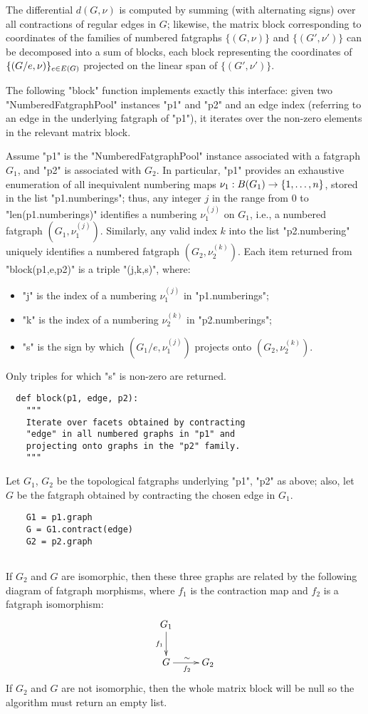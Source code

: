 The differential $d(G,\nu)$ is computed by summing (with alternating
signs) over all contractions of regular edges in $G$; likewise, the
matrix block corresponding to coordinates of the families of numbered
fatgraphs $\{(G,\nu)\}$ and $\{(G',\nu')\}$ can be decomposed into a
sum of blocks, each block representing the coordinates of $\{(G/e,\nu)
\}_{e \in E(G)}$ projected on the linear span of $\{(G',\nu')\}$.

The following "block" function implements exactly this interface:
given two "NumberedFatgraphPool" instances "p1" and "p2" and an edge
index (referring to an edge in the underlying fatgraph of "p1"), it
iterates over the non-zero elements in the relevant matrix block.

Assume "p1" is the "NumberedFatgraphPool" instance associated with a
fatgraph $G_1$, and "p2" is associated with $G_2$.  In particular,
"p1" provides an exhaustive enumeration of all inequivalent numbering
maps $\nu_1: B(G_1) \to \{1, \ldots, n\}$, stored in the list
"p1.numberings"; thus, any integer $j$ in the range from 0 to
"len(p1.numberings)" identifies a numbering $\nu_1^{(j)}$ on $G_1$,
i.e., a numbered fatgraph $(G_1, \nu_1^{(j)})$.  Similarly, any valid
index $k$ into the list "p2.numbering" uniquely identifies a numbered
fatgraph $(G_2, \nu_2^{(k)})$.  Each item returned from
"block(p1,e,p2)" is a triple "(j,k,s)", where:
\begin{itemize}
\item "j" is the index of a numbering $\nu_1^{(j)}$ in "p1.numberings";
\item "k" is the index of a numbering $\nu_2^{(k)}$ in "p2.numberings";
\item "s" is the sign by which $(G_1/e, \nu_1^{(j)})$ projects onto
  $(G_2, \nu_2^{(k)})$.
\end{itemize}
Only triples for which "s" is non-zero are returned.

\begin{lstlisting}
  def block(p1, edge, p2):
    """
    Iterate over facets obtained by contracting 
    "edge" in all numbered graphs in "p1" and 
    projecting onto graphs in the "p2" family.
    """

\end{lstlisting}

Let $G_1$, $G_2$ be the topological fatgraphs underlying "p1", "p2" as
above; also, let $G$ be the fatgraph obtained by contracting the
chosen edge in $G_1$.
\begin{lstlisting}
    G1 = p1.graph
    G = G1.contract(edge)
    G2 = p2.graph
    
\end{lstlisting}
If $G_2$ and $G$ are isomorphic, then these three graphs are related
by the following diagram of fatgraph morphisms, where $f_1$ is the
contraction map and $f_2$ is a fatgraph isomorphism:
\begin{equation*}
  \xymatrix{
    G_1 & 
    \\
    G   &  G_2
    \ar_{f_1} "1,1";"2,1"
    \ar_{f_2}^{\sim} "2,1";"2,2"
  }
\end{equation*}
If $G_2$ and $G$ are not isomorphic, then the whole matrix block will
be null so the algorithm must return an empty list.

